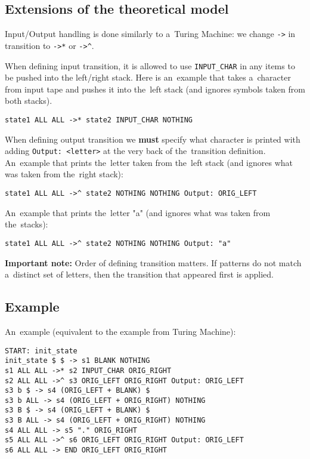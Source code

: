 \documentclass[english,shortabstract,mgr]{iithesis}
\begin{document}
\subsection {Extensions of the theoretical model}

Input/Output handling is done similarly to a~Turing Machine: we change \texttt{->} in transition
to \texttt{->*} or \texttt{->\^}.

When defining input transition, it is allowed to use \texttt{INPUT\_CHAR} in any items
to be pushed into the left/right stack. Here is an~example that takes a~character from input
tape and pushes it into the~left stack (and ignores symbols taken from both stacks).
\begin{verbatim}
state1 ALL ALL ->* state2 INPUT_CHAR NOTHING
\end{verbatim}

When defining output transition we \textbf{must} specify what character is printed
with adding \texttt{Output: <letter>} at the very back of the~transition definition.
An~example that prints the~letter taken from the~left stack (and ignores what was
taken from the~right stack):
\begin{verbatim}
state1 ALL ALL ->^ state2 NOTHING NOTHING Output: ORIG_LEFT
\end{verbatim}
An~example that prints the~letter "a" (and ignores what was taken from the~stacks):
\begin{verbatim}
state1 ALL ALL ->^ state2 NOTHING NOTHING Output: "a"
\end{verbatim}

\textbf{Important note:} Order of defining transition matters. If patterns do not match
a~distinct set of letters, then the transition that appeared first is applied.

\subsection{Example}

An~example (equivalent to the example from Turing Machine):
\begin{verbatim}
START: init_state
init_state $ $ -> s1 BLANK NOTHING
s1 ALL ALL ->* s2 INPUT_CHAR ORIG_RIGHT
s2 ALL ALL ->^ s3 ORIG_LEFT ORIG_RIGHT Output: ORIG_LEFT
s3 b $ -> s4 (ORIG_LEFT + BLANK) $
s3 b ALL -> s4 (ORIG_LEFT + ORIG_RIGHT) NOTHING
s3 B $ -> s4 (ORIG_LEFT + BLANK) $
s3 B ALL -> s4 (ORIG_LEFT + ORIG_RIGHT) NOTHING
s4 ALL ALL -> s5 "." ORIG_RIGHT
s5 ALL ALL ->^ s6 ORIG_LEFT ORIG_RIGHT Output: ORIG_LEFT
s6 ALL ALL -> END ORIG_LEFT ORIG_RIGHT
\end{verbatim}
\end{document}
